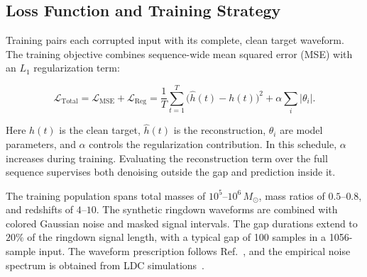 \documentclass[prd,aps,a4paper,twocolumn,superscriptaddress,nofootinbib,floatfix]{revtex4-2}
\begin{document}

\subsection{Loss Function and Training Strategy}%
\label{loss}



Training pairs each corrupted input with its complete, clean target waveform. The training objective combines sequence-wide mean squared error (MSE) with an $L_1$ regularization term:

\begin{equation}
\mathcal{L}_{\text{Total}}
= \mathcal{L}_{\text{MSE}} + \mathcal{L}_{\text{Reg}}
= \frac{1}{T}\sum_{t=1}^{T}\!\bigl(\hat{h}(t)-h(t)\bigr)^{2}
  + \alpha \sum_{i}\!\left\lvert \theta_{i} \right\rvert .
\end{equation}

Here $h(t)$ is the clean target, $\hat h(t)$ is the reconstruction, $\theta_i$ are model parameters, and $\alpha$ controls the regularization contribution. In this schedule, $\alpha$ increases during training. Evaluating the reconstruction term over the full sequence supervises both denoising outside the gap and prediction inside it.


The training population spans total masses of $10^5$--$10^6\,M_\odot$, mass ratios of $0.5$--$0.8$, and redshifts of $4$--$10$. The synthetic ringdown waveforms are combined with colored Gaussian noise and masked signal intervals. The gap durations extend to $20\%$ of the ringdown signal length, with a typical gap of 100 samples in a 1056-sample input. The waveform prescription follows Ref.~\cite{zhang2021parameter}, and the empirical noise spectrum is obtained from LDC simulations~\cite{Babak_2008,Babak_2010}.

\end{document}
